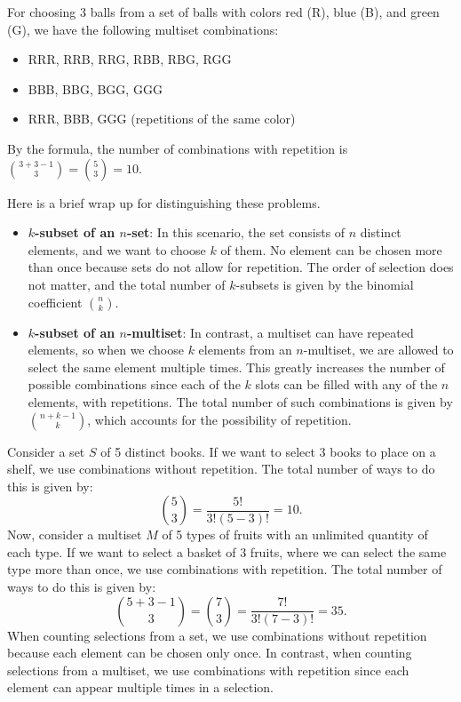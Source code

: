         \begin{example}
            For choosing 3 balls from a set of balls with colors red (R), blue (B), and green (G), we have the following multiset combinations:
            \begin{itemize}
              \item RRR, RRB, RRG, RBB, RBG, RGG
              \item BBB, BBG, BGG, GGG
              \item RRR, BBB, GGG (repetitions of the same color)
            \end{itemize}
            By the formula, the number of combinations with repetition is \( \binom{3 + 3 - 1}{3} = \binom{5}{3} = 10 \).
        \end{example}
        Here is a brief wrap up for distinguishing these problems.
        \begin{itemize}
            \item \textbf{$k$-subset of an \( n \)-set}: In this scenario, the set consists of \( n \) distinct elements, and we want to choose \( k \) of them. No element can be chosen more than once because sets do not allow for repetition. The order of selection does not matter, and the total number of \( k \)-subsets is given by the binomial coefficient \( \binom{n}{k} \).
            \item \textbf{$k$-subset of an \( n \)-multiset}: In contrast, a multiset can have repeated elements, so when we choose \( k \) elements from an \( n \)-multiset, we are allowed to select the same element multiple times. This greatly increases the number of possible combinations since each of the \( k \) slots can be filled with any of the \( n \) elements, with repetitions. The total number of such combinations is given by \( \binom{n+k-1}{k} \), which accounts for the possibility of repetition.
        \end{itemize}
        \begin{example}
            Consider a set \( S \) of 5 distinct books. If we want to select 3 books to place on a shelf, we use combinations without repetition. The total number of ways to do this is given by:
            \[ \binom{5}{3} = \frac{5!}{3!(5-3)!} = 10. \]
            Now, consider a multiset \( M \) of 5 types of fruits with an unlimited quantity of each type. If we want to select a basket of 3 fruits, where we can select the same type more than once, we use combinations with repetition. The total number of ways to do this is given by:
            \[ \binom{5+3-1}{3} = \binom{7}{3} = \frac{7!}{3!(7-3)!} = 35. \]
            When counting selections from a set, we use combinations without repetition because each element can be chosen only once. In contrast, when counting selections from a multiset, we use combinations with repetition since each element can appear multiple times in a selection.
        \end{example}
        
